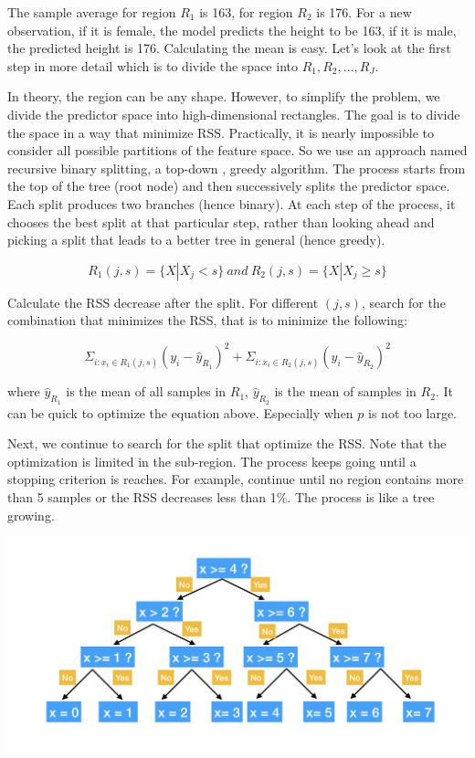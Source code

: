\documentclass[12pt,]{krantz}
\begin{document}
The sample average for region \(R_1\) is 163, for region \(R_2\) is 176. For a new observation, if it is female, the model predicts the height to be 163, if it is male, the predicted height is 176. Calculating the mean is easy. Let's look at the first step in more detail which is to divide the space into \(R_1, R_2, \dots, R_J\).

In theory, the region can be any shape. However, to simplify the problem, we divide the predictor space into high-dimensional rectangles. The goal is to divide the space in a way that minimize RSS. Practically, it is nearly impossible to consider all possible partitions of the feature space. So we use an approach named recursive binary splitting, a top-down , greedy algorithm. The process starts from the top of the tree (root node) and then successively splits the predictor space. Each split produces two branches (hence binary). At each step of the process, it chooses the best split at that particular step, rather than looking ahead and picking a split that leads to a better tree in general (hence greedy).

\[R_{1}(j, s)=\{X|X_j<s\}\ and\ R_{2}(j, s)=\{X|X_j\geq s\}\]

Calculate the RSS decrease after the split. For different \((j,s)\), search for the combination that minimizes the RSS, that is to minimize the following:

\[\Sigma_{i:x_i\in R_1(j,s)}(y_i-\hat{y}_{R_{1}})^2+\Sigma_{i:x_i\in R_2(j,s)}(y_i-\hat{y}_{R_{2}})^2\]

where \(\hat{y}_{R_1}\) is the mean of all samples in \(R_1\), \(\hat{y}_{R_2}\) is the mean of samples in \(R_2\). It can be quick to optimize the equation above. Especially when \(p\) is not too large.

Next, we continue to search for the split that optimize the RSS. Note that the optimization is limited in the sub-region. The process keeps going until a stopping criterion is reaches. For example, continue until no region contains more than 5 samples or the RSS decreases less than 1\%. The process is like a tree growing.

\includegraphics{images/BinaryTree.png}
\end{document}
